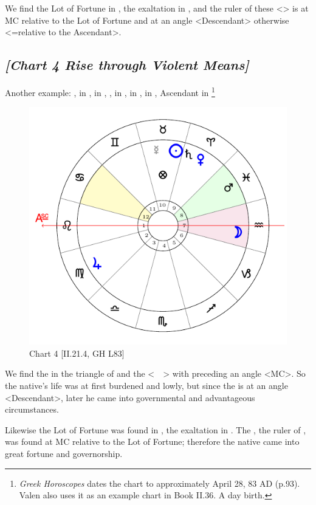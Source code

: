 We find the Lot of Fortune in \Taurus, the exaltation in \Libra, and the ruler of these <\Venus> is at MC relative to the Lot of Fortune and at an angle <Descendant> otherwise <=relative to the Ascendant>.
\newpage
\subsection*{\textit{[Chart 4 Rise through Violent Means]}}

Another example: \Sun, \Mercury\xspace in \Taurus, \Moon\xspace in \Aquarius, \Saturn, \Venus\xspace in \Aries, \Jupiter\xspace in \Virgo, \Mars\xspace in \Pisces, Ascendant in \Leo
\footnote{\textit{Greek Horoscopes} dates the chart to approximately April 28, 83 AD (p.93). Valen also uses it as an example chart in Book II.36. A day birth.}

\clearpage
\begin{figure}
\centering
\vspace{-20pt}
\includegraphics[width=.68\textwidth]{charts/2_21_4}
\caption{Chart 4 [II.21.4, GH L83]}
\label{fig:chart04}
\end{figure}

We find the \Sun\xspace in the triangle of \Venus\xspace and the \Moon\xspace <\Taurus\, \Virgo\, \Capricorn> with \Venus\xspace preceding an angle <MC>. So the native’s life was at first burdened and lowly, but since the \Moon\xspace is at an angle <Descendant>, later he came into governmental and advantageous circumstances. 

Likewise the Lot of Fortune was found in \Taurus, the exaltation in \Cancer. The \Moon, the ruler of \Cancer, was found at MC relative to the Lot of Fortune; therefore the native came into great fortune and governorship. 

